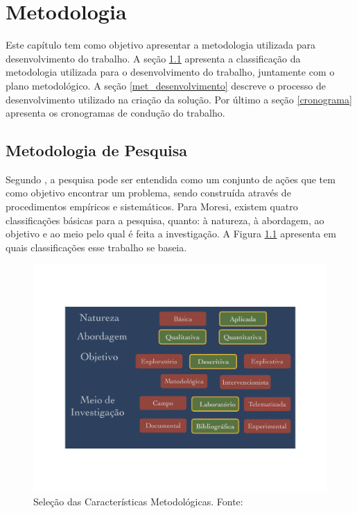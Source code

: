 \chapter[Metodologia]{Metodologia}

Este capítulo tem como objetivo apresentar a metodologia utilizada para desenvolvimento do trabalho. A seção \ref{met_pesquisa} apresenta a classificação da metodologia utilizada para o desenvolvimento do trabalho, juntamente com o plano metodológico. A seção \ref{met_desenvolvimento} descreve o processo de desenvolvimento utilizado na criação da solução. Por último a seção \ref{cronograma} apresenta os cronogramas de condução do trabalho.
\section{Metodologia de Pesquisa}
\label{met_pesquisa}
Segundo \cite{moresi_metodologia_2003}, a pesquisa pode ser entendida como um conjunto de ações que tem como objetivo encontrar um problema, sendo construída através de procedimentos empíricos e sistemáticos. Para Moresi, existem quatro classificações básicas para a pesquisa, quanto: à natureza, à abordagem, ao objetivo e ao meio pelo qual é feita a investigação. A Figura \ref{img:met_pesquisa} apresenta em quais classificações esse trabalho se baseia.
\graphicspath{{figuras/}}
\begin{figure}[h!]
\centering
\includegraphics[scale=0.50]{metodologia_pesquisa}
\caption{Seleção das Características Metodológicas. Fonte: \cite{moresi_metodologia_2003}}
\label{img:met_pesquisa}
\end{figure}

